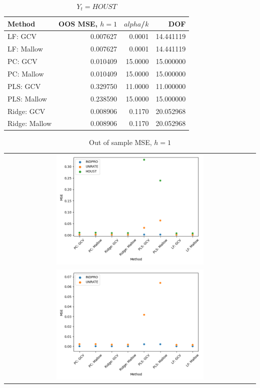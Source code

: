 \begin{table}[h!]
\centering
\caption{$Y_t = HOUST$}
\label{tab::houst}
\begin{tabular}{lrrr}
\toprule
       Method &  OOS MSE, $h =1$ &  $alpha$/$k$ &  DOF \\
\midrule
      LF: GCV & 0.007627 &   0.0001 & 14.441119 \\
   LF: Mallow & 0.007627 &   0.0001 & 14.441119 \\
      PC: GCV & 0.010409 &  15.0000 & 15.000000 \\
   PC: Mallow & 0.010409 &  15.0000 & 15.000000 \\
     PLS: GCV & 0.329750 &  11.0000 & 11.000000 \\
  PLS: Mallow & 0.238590 &  15.0000 & 15.000000 \\
   Ridge: GCV & 0.008906 &   0.1170 & 20.052968 \\
Ridge: Mallow & 0.008906 &   0.1170 & 20.052968 \\
\bottomrule
\end{tabular}
\end{table}


\begin{table}[]
    \centering
    \begin{tabular}{c}
        \includegraphics[width=0.6\textwidth]{figures/MSE_oos_h1.png} \\
        \includegraphics[width=0.6\textwidth]{figures/MSE_oos_h1_noHOUST.png}
    \end{tabular}
    \caption*{Out of sample MSE, $h = 1$}
\end{table}

